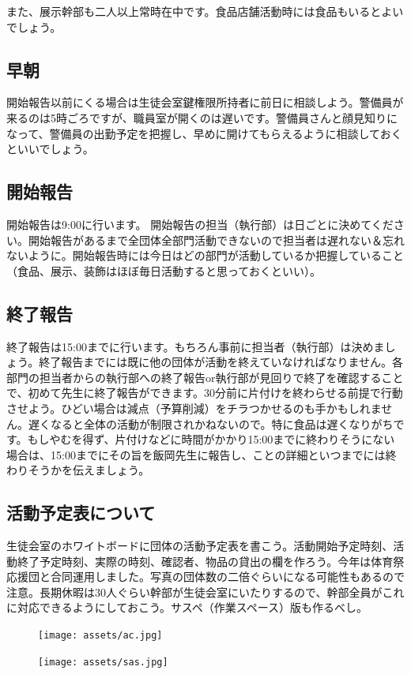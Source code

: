 \documentclass[a4paper]{ltjsreport}
\begin{document}
また、展示幹部も二人以上常時在中です。食品店舗活動時には食品もいるとよいでしょう。

\subsection{早朝}
開始報告以前にくる場合は生徒会室鍵権限所持者に前日に相談しよう。警備員が来るのは5時ごろですが、職員室が開くのは遅いです。警備員さんと顔見知りになって、警備員の出勤予定を把握し、早めに開けてもらえるように相談しておくといいでしょう。

\subsection{開始報告}
開始報告は9:00に行います。
開始報告の担当（執行部）は日ごとに決めてください。開始報告があるまで全団体全部門活動できないので担当者は遅れない＆忘れないように。開始報告時には今日はどの部門が活動しているか把握していること（食品、展示、装飾はほぼ毎日活動すると思っておくといい）。

\subsection{終了報告}
終了報告は15:00までに行います。もちろん事前に担当者（執行部）は決めましょう。終了報告までには既に他の団体が活動を終えていなければなりません。各部門の担当者からの執行部への終了報告or執行部が見回りで終了を確認することで、初めて先生に終了報告ができます。30分前に片付けを終わらせる前提で行動させよう。ひどい場合は減点（予算削減）をチラつかせるのも手かもしれません。遅くなると全体の活動が制限されかねないので。特に食品は遅くなりがちです。もしやむを得ず、片付けなどに時間がかかり15:00までに終わりそうにない場合は、15:00までにその旨を飯岡先生に報告し、ことの詳細といつまでには終わりそうかを伝えましょう。

\subsection{活動予定表について}
生徒会室のホワイトボードに団体の活動予定表を書こう。活動開始予定時刻、活動終了予定時刻、実際の時刻、確認者、物品の貸出の欄を作ろう。今年は体育祭応援団と合同運用しました。写真の団体数の二倍ぐらいになる可能性もあるので注意。長期休暇は30人ぐらい幹部が生徒会室にいたりするので、幹部全員がこれに対応できるようにしておこう。サスペ（作業スペース）版も作るべし。
\begin{figure}[h]
  \begin{center}
    \texttt{[image: assets/ac.jpg]}
  \end{center}
\end{figure}
\begin{figure}[h]
  \begin{center}
    \texttt{[image: assets/sas.jpg]}
  \end{center}
\end{figure}
\end{document}
